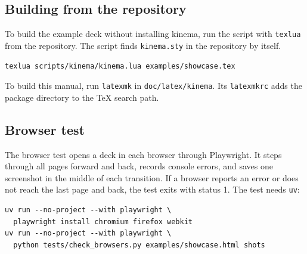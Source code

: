 \documentclass[11pt]{article}
\newcommand{\pkg}{\textsf{kinema}}
\newcommand{\cmd}[1]{\texttt{#1}}
\begin{document}
\subsection{Building from the repository}

To build the example deck without installing \pkg{}, run the script with
\cmd{texlua} from the repository. The script finds \cmd{kinema.sty} in the
repository by itself.
\begin{lstlisting}
texlua scripts/kinema/kinema.lua examples/showcase.tex
\end{lstlisting}
To build this manual, run \cmd{latexmk} in \cmd{doc/latex/kinema}. Its
\cmd{latexmkrc} adds the package directory to the TeX search path.

\subsection{Browser test}

The browser test opens a deck in each browser through Playwright. It steps through
all pages forward and back, records console errors, and saves one screenshot in
the middle of each transition. If a browser reports an error or does not reach the
last page and back, the test exits with status 1. The test needs \cmd{uv}:
\begin{lstlisting}
uv run --no-project --with playwright \
  playwright install chromium firefox webkit
uv run --no-project --with playwright \
  python tests/check_browsers.py examples/showcase.html shots
\end{lstlisting}
\end{document}
